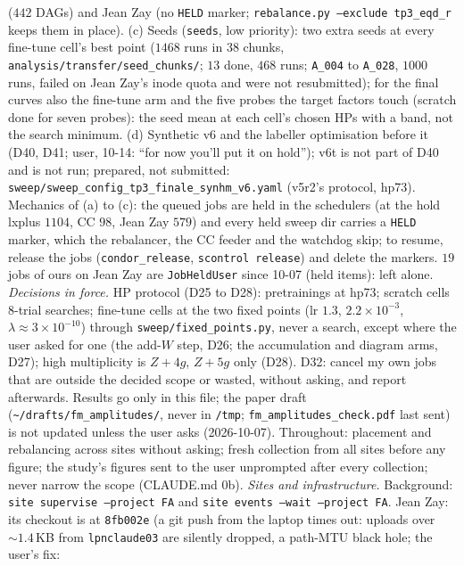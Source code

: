 \documentclass[11pt]{article}
\newcommand{\code}[1]{\texttt{#1}}
\begin{document}
\begin{itemize}
    ($442$ DAGs) and Jean Zay (no \code{HELD} marker; \code{rebalance.py --exclude tp3\_eqd\_r} keeps them in place).
    (c) Seeds (\code{seeds}, low priority): two extra seeds at every fine-tune cell's best point ($1468$ runs in $38$
    chunks, \code{analysis/transfer/seed\_chunks/}; $13$ done, $468$ runs; \code{A\_004} to \code{A\_028}, $1000$ runs, failed
    on Jean Zay's inode quota and were not resubmitted); for the final curves also the fine-tune arm and the five probes
    the target factors touch (scratch done for seven probes): the seed mean at each cell's chosen HPs with a band, not the
    search minimum. (d) Synthetic v6 and the labeller optimisation before it (D40, D41; user, 10-14: ``for now you'll
    put it on hold''); v6t is not part of D40 and is not run; prepared, not submitted:
    \code{sweep/sweep\_config\_tp3\_finale\_synhm\_v6.yaml} (v5r2's protocol, hp73). Mechanics of (a) to (c): the queued
    jobs are held in the schedulers (at the hold lxplus $1104$, CC $98$, Jean Zay $579$) and every held sweep dir carries
    a \code{HELD} marker, which the rebalancer, the CC feeder and the watchdog skip; to resume, release the jobs
    (\code{condor\_release}, \code{scontrol release}) and delete the markers. $19$ jobs of ours on Jean Zay are
    \code{JobHeldUser} since 10-07 (held items): left alone.
    \emph{Decisions in force.} HP protocol (D25 to D28): pretrainings at hp73; scratch cells $8$-trial searches; fine-tune
    cells at the two fixed points (lr $1.3$, $2.2\times10^{-3}$, $\lambda\approx3\times10^{-10}$) through
    \code{sweep/fixed\_points.py}, never a search, except where the user asked for one (the add-$W$ step, D26; the
    accumulation and diagram arms, D27); high multiplicity is $Z+4g$, $Z+5g$ only (D28). D32: cancel my own jobs that are
    outside the decided scope or wasted, without asking, and report afterwards. Results go only in this file; the paper
    draft (\code{\textasciitilde/drafts/fm\_amplitudes/}, never in \code{/tmp}; \code{fm\_amplitudes\_check.pdf} last sent) is
    not updated unless the user asks (2026-10-07). Throughout: placement and rebalancing across sites without asking;
    fresh collection from all sites before any figure; the study's figures sent to the user unprompted after every
    collection; never narrow the scope (CLAUDE.md 0b).
    \emph{Sites and infrastructure.} Background: \code{site supervise --project FA} and \code{site events --wait
    --project FA}. Jean Zay: its checkout is at \code{8fb002e} (a git push from the laptop times out: uploads over
    $\sim1.4$\,KB from \code{lpnclaude03} are silently dropped, a path-MTU black hole; the user's fix:

\end{itemize}
\end{document}
